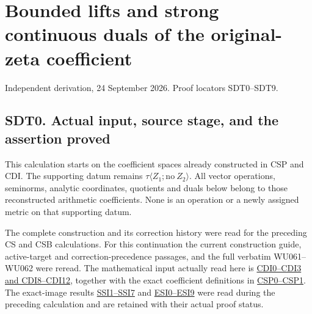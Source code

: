 \section{Bounded lifts and strong continuous duals of the original-zeta
coefficient}\label{bounded-lifts-and-strong-continuous-duals-of-the-original-zeta-coefficient}

Independent derivation, 24 September 2026. Proof locators SDT0--SDT9.

\subsection{SDT0. Actual input, source stage, and the assertion
proved}\label{sdt0.-actual-input-source-stage-and-the-assertion-proved}

This calculation starts on the coefficient spaces already constructed in
CSP and CDI. The supporting datum remains
\(\tau\langle Z_1;\mathrm{no}\ Z_2\rangle\). All vector operations,
seminorms, analytic coordinates, quotients and duals below belong to
those reconstructed arithmetic coefficients. None is an operation or a
newly assigned metric on that supporting datum.

The complete construction and its correction history were read for the
preceding CS and CSB calculations. For this continuation the current
construction guide, active-target and correction-precedence passages,
and the full verbatim WU061--WU062 were reread. The mathematical input
actually read here is
\href{https://github.com/KokunoYumeto/zeta-function-research-reader/blob/main/workbenches/splitzero-tandem/continuations/20260924-cohomology-weight-and-character-lifts/geometric-positive-quotient/CC_CONTINUOUS_DUAL_INDEPENDENT.md}{CDI0--CDI3
and CDI8--CDI12}, together with the exact coefficient definitions in
\href{https://github.com/KokunoYumeto/zeta-function-research-reader/blob/main/workbenches/splitzero-tandem/continuations/20260924-cohomology-weight-and-character-lifts/gct-weight-control/proofs/CC_SPHERE_PULLBACK_AND_NORMAL_DIRECTION.md}{CSP0--CSP1}.
The exact-image results
\href{https://github.com/KokunoYumeto/zeta-function-research-reader/blob/main/workbenches/splitzero-tandem/continuations/20260924-cohomology-weight-and-character-lifts/geometric-positive-quotient/EXACT_SCHWARTZ_SUMMATION_IMAGE.md}{SSI1--SSI7}
and
\href{https://github.com/KokunoYumeto/zeta-function-research-reader/blob/main/workbenches/splitzero-tandem/continuations/20260924-cohomology-weight-and-character-lifts/geometric-positive-quotient/EXACT_SCHWARTZ_IMAGE_INDEPENDENT_CHECK.md}{ESI0--ESI9}
were read during the preceding calculation and are retained with their
actual proof status.

